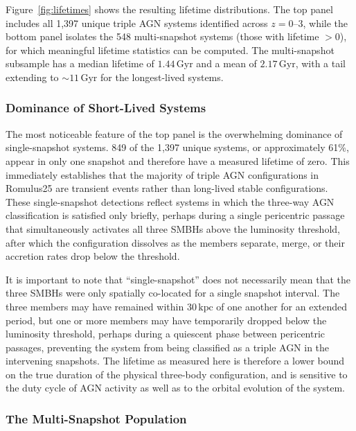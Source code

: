 \documentclass[twocolumn, 10pt]{article}
\begin{document}
Figure~\ref{fig:lifetimes} shows the resulting lifetime distributions. The top panel includes all 1,397 unique triple AGN systems identified across $z = 0$--$3$, while the bottom panel isolates the 548 multi-snapshot systems (those with lifetime $> 0$), for which meaningful lifetime statistics can be computed. The multi-snapshot subsample has a median lifetime of $\mathbf{1.44\,\mathrm{Gyr}}$ and a mean of $\mathbf{2.17\,\mathrm{Gyr}}$, with a tail extending to $\sim 11\,\mathrm{Gyr}$ for the longest-lived systems.
 
\subsubsection{Dominance of Short-Lived Systems}
\label{subsubsec:lifetime_short}
 
The most noticeable feature of the top panel is the overwhelming dominance of single-snapshot systems. 849 of the 1,397 unique systems, or approximately 61\%, appear in only one snapshot and therefore have a measured lifetime of zero. This immediately establishes that the majority of triple AGN configurations in Romulus25 are transient events rather than long-lived stable configurations. These single-snapshot detections reflect systems in which the three-way AGN classification is satisfied only briefly, perhaps during a single pericentric passage that simultaneously activates all three SMBHs above the luminosity threshold, after which the configuration dissolves as the members separate, merge, or their accretion rates drop below the threshold.
 
It is important to note that ``single-snapshot'' does not necessarily mean that the three SMBHs were only spatially co-located for a single snapshot interval. The three members may have remained within $30\,\mathrm{kpc}$ of one another for an extended period, but one or more members may have temporarily dropped below the luminosity threshold, perhaps during a quiescent phase between pericentric passages, preventing the system from being classified as a triple AGN in the intervening snapshots. The lifetime as measured here is therefore a lower bound on the true duration of the physical three-body configuration, and is sensitive to the duty cycle of AGN activity as well as to the orbital evolution of the system.
 
\subsubsection{The Multi-Snapshot Population}
\label{subsubsec:lifetime_multi}
 
\end{document}
